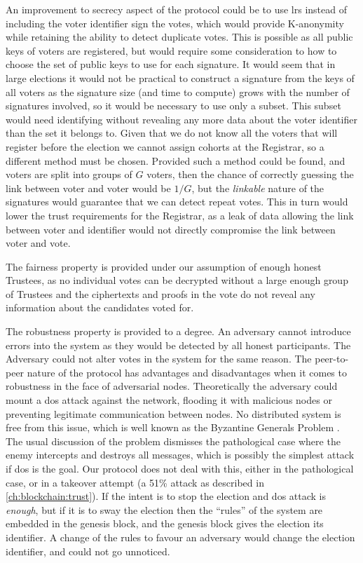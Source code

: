An improvement to secrecy aspect of the protocol could be to use \gls{lrs} instead of including the voter identifier sign the votes, which would provide K-anonymity while retaining the ability to detect duplicate votes. This is possible as all public keys of voters are registered, but would require some consideration to how to choose the set of public keys to use for each signature. It would seem that in large elections it would not be practical to construct a signature from the keys of all voters as the signature size (and time to compute) grows with the number of signatures involved, so it would be necessary to use only a subset. This subset would need identifying without revealing any more data about the voter identifier than the set it belongs to. Given that we do not know all the voters that will register before the election we cannot assign cohorts at the Registrar, so a different  method must be chosen. Provided such a method could be found, and voters are split into groups of $G$ voters, then the chance of correctly guessing the link between voter and voter would be $1/G$, but the \emph{linkable} nature of the signatures would guarantee that we can detect repeat votes. This in turn would lower the trust requirements for the Registrar, as a leak of data allowing the link between voter and identifier would not directly compromise the link between voter and vote.

The fairness property is provided under our assumption of enough honest Trustees, as no individual votes can be decrypted without a large enough group of Trustees and the ciphertexts and proofs in the vote do not reveal any information about the candidates voted for.

The robustness property is provided to a degree. An adversary cannot introduce errors into the system as they would be detected by all honest participants. The Adversary could not alter votes in the system for the same reason. The peer-to-peer nature of the protocol has advantages and disadvantages when it comes to robustness in the face of adversarial nodes. Theoretically the adversary could mount a \gls{dos} attack against the network, flooding it with malicious nodes or preventing legitimate communication between nodes. No distributed system is free from this issue, which is well known as the Byzantine Generals Problem \cite{lamportByzantineGeneralsProblem1982}. The usual discussion of the problem dismisses the pathological case where the enemy intercepts and destroys all messages, which is possibly the simplest attack if \gls{dos} is the goal. Our protocol does not deal with this, either in the pathological case, or in a takeover attempt (a 51\% attack as described in \autoref{ch:blockchain:trust}). If the intent is to stop the election and \gls{dos} attack is \emph{enough}, but if it is to sway the election then the ``rules'' of the system are embedded in the genesis block, and the genesis block gives the election its identifier. A change of the rules to favour an adversary would change the election identifier, and could not go unnoticed.

